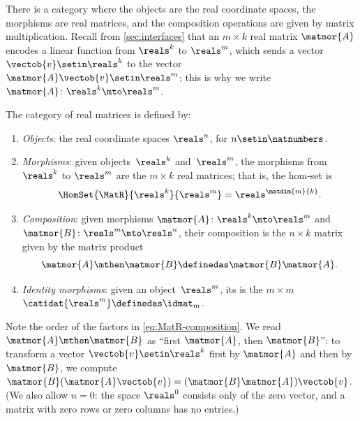 \begin{example}
    \label{exa:the-category-of-real-matrices}
    There is a category where the objects are the real coordinate spaces, the morphisms are real matrices, and the composition operations are given by matrix multiplication.
    Recall from \cref{sec:interfaces} that an $m \times k$ real matrix $\matmor{A}$ encodes a linear function from $\reals^k$ to $\reals^m$, which sends a vector $\vectob{v} \setin \reals^k$ to the vector $\matmor{A}\vectob{v} \setin \reals^m$; this is why we write $\matmor{A} \colon \reals^k \mto \reals^m$.

    \begin{ctdefinition}
    \label{def:MatR}
    The category \MatR of real matrices is defined by:
    \begin{enumerate}
        \item \emph{Objects}: the real coordinate spaces $\reals^n$, for $n \setin \natnumbers$.
        \item \emph{Morphisms}: given objects~$\reals^k$ and~$\reals^m$, the morphisms from $\reals^k$ to $\reals^m$ are the $m \times k$ real matrices; that is, the hom-set is
              \begin{equation}
                  \HomSet{\MatR}{\reals^k}{\reals^m} = \reals^{\matdim{m}{k}}.
              \end{equation}
        \item \emph{Composition}: given morphisms $\matmor{A} \colon \reals^k \mto \reals^m$ and $\matmor{B} \colon \reals^m \mto \reals^n$, their composition is the $n \times k$ matrix given by the matrix product
              \begin{equation}
                  \label{eq:MatR-composition}
                  \matmor{A} \mthen \matmor{B} \definedas \matmor{B}\matmor{A}.
              \end{equation}
        \item \emph{Identity morphisms}: given an object~$\reals^m$, its  is the $m \times m$ ~$\catidat{\reals^m} \definedas \idmat_m$.
    \end{enumerate}
\end{ctdefinition}

    Note the order of the factors in \cref{eq:MatR-composition}. We read $\matmor{A} \mthen \matmor{B}$ as ``first $\matmor{A}$, then $\matmor{B}$'': to transform a vector $\vectob{v} \setin \reals^k$ first by $\matmor{A}$ and then by $\matmor{B}$, we compute $\matmor{B}(\matmor{A}\vectob{v}) = (\matmor{B}\matmor{A})\vectob{v}$.
    (We also allow $n = 0$: the space $\reals^0$ consists only of the zero vector, and a matrix with zero rows or zero columns has no entries.)


\end{example}
